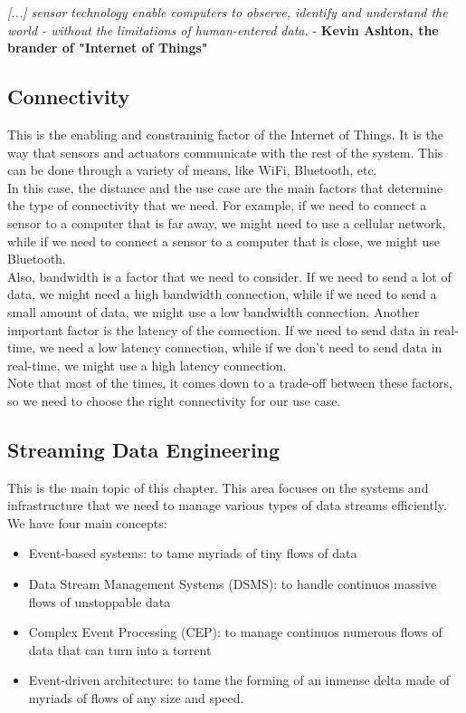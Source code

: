 \textit{[...] sensor technology enable computers to observe, identify and understand the world - without
the limitations of human-entered data.} - \textbf{Kevin Ashton, the brander of "Internet of Things"}\\

\subsection{Connectivity}

This is the enabling and constraninig factor of the Internet of Things. It is the way that sensors and actuators
communicate with the rest of the system. This can be done through a variety of means, like WiFi, Bluetooth, etc.\\

In this case, the distance and the use case are the main factors that determine the type of connectivity that
we need. For example, if we need to connect a sensor to a computer that is far away, we might need to use a
cellular network, while if we need to connect a sensor to a computer that is close, we might use Bluetooth.\\

Also, bandwidth is a factor that we need to consider. If we need to send a lot of data, we might need a high
bandwidth connection, while if we need to send a small amount of data, we might use a low bandwidth connection.
Another important factor is the latency of the connection. If we need to send data in real-time,
we need a low latency connection, while if we don't need to send data in real-time, we might use a high latency
connection.\\

Note that most of the times, it comes down to a trade-off between these factors, so we need to choose the
right connectivity for our use case.

\subsection{Streaming Data Engineering}

This is the main topic of this chapter. This area focuses on the systems and infrastructure that we need to
manage various types of data streams efficiently. We have four main concepts:

\begin{itemize}
    \item Event-based systems: to tame myriads of tiny flows of data
    \item Data Stream Management Systems (DSMS): to handle continuos massive flows of unstoppable data
    \item Complex Event Processing (CEP): to manage continuos numerous flows of data that can turn into a torrent
    \item Event-driven architecture: to tame the forming of an inmense delta made of myriads of flows of any size and speed.
\end{itemize}

